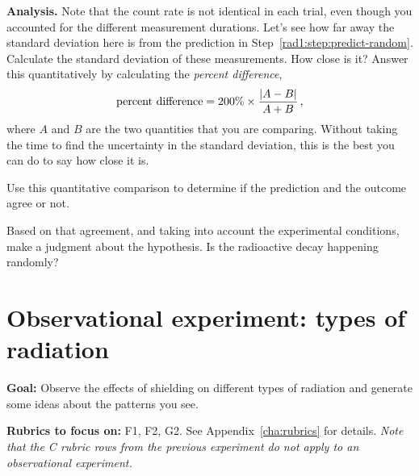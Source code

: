 \begin{steps}
	\item \textbf{Analysis.} Note that the count rate is not identical in each trial, even though you accounted for the different measurement durations. Let's see how far away the standard deviation here is from the prediction in Step~\ref{rad1:step:predict-random}. Calculate the standard deviation of these measurements. How close is it? Answer this quantitatively by calculating the \textit{percent difference},
	\begin{equation}
	 \textrm{percent difference} = 200\% \times \frac{\left\lvert A - B\right\rvert}{A+B} \,,
	\end{equation}
	where $A$ and $B$ are the two quantities that you are comparing. Without taking the time to find the uncertainty in the standard deviation, this is the best you can do to say how close it is.
	
	
	\item Use this quantitative comparison to determine if the prediction and the outcome agree or not.
	
	\item Based on that agreement, and taking into account the experimental conditions, make a judgment about the hypothesis. Is the radioactive decay happening randomly?
\end{steps}

\section{Observational experiment: types of radiation}

\textbf{Goal:} Observe the effects of shielding on different types of radiation and generate some ideas about the patterns you see.

\textbf{Rubrics to focus on:} F1, F2, G2. See Appendix~\ref{cha:rubrics} for details. \textit{Note that the C rubric rows from the previous experiment do not apply to an observational experiment.}

